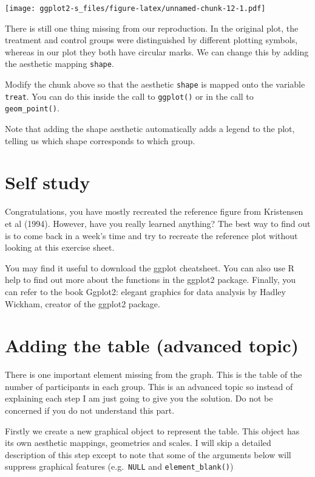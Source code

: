 \documentclass[
]{book}
\begin{document}
\texttt{[image: ggplot2-s\_files/figure-latex/unnamed-chunk-12-1.pdf]}

There is still one thing missing from our reproduction. In the original plot, the treatment and control groups were distinguished by different plotting symbols, whereas in our plot they both have circular marks. We can change this by adding the aesthetic mapping \texttt{shape}.

Modify the chunk above so that the aesthetic \texttt{shape} is mapped onto the variable \texttt{treat}. You can do this inside the call to \texttt{ggplot()} or in the call to \texttt{geom\_point()}.

Note that adding the shape aesthetic automatically adds a legend to the plot, telling us which shape corresponds to which group.

\section{Self study}\label{self-study}

Congratulations, you have mostly recreated the reference figure from Kristensen et al (1994). However, have you really learned anything? The best way to find out is to come back in a week's time and try to recreate the reference plot without looking at this exercise sheet.

You may find it useful to download the ggplot cheatsheet. You can also use R help to find out more about the functions in the ggplot2 package. Finally, you can refer to the book Ggplot2: elegant graphics for data analysis by Hadley Wickham, creator of the ggplot2 package.

\section{Adding the table (advanced topic)}\label{adding-the-table-advanced-topic}

There is one important element missing from the graph. This is the table of the number of participants in each group. This is an advanced topic so instead of explaining each step I am just going to give you the solution. Do not be concerned if you do not understand this part.

Firstly we create a new graphical object to represent the table. This object has its own aesthetic mappings, geometries and scales. I will skip a detailed description of this step except to note that some of the arguments below will suppress graphical features (e.g.~\texttt{NULL} and \texttt{element\_blank()})
\end{document}
